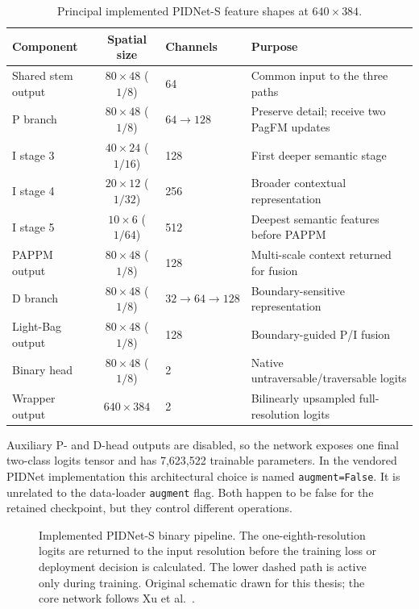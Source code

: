 \begin{table}[H]
\centering
\caption{Principal implemented PIDNet-S feature shapes at $640\times384$.}
\label{tab:pidnet_tensor_shapes}
\small
\begin{tabularx}{\textwidth}{@{}lclX@{}}
\toprule
\textbf{Component} & \textbf{Spatial size} & \textbf{Channels} & \textbf{Purpose} \\
\midrule
Shared stem output & $80\times48$ ($1/8$) & 64 & Common input to the three paths \\
P branch & $80\times48$ ($1/8$) & $64\rightarrow128$ & Preserve detail; receive two PagFM updates \\
I stage 3 & $40\times24$ ($1/16$) & 128 & First deeper semantic stage \\
I stage 4 & $20\times12$ ($1/32$) & 256 & Broader contextual representation \\
I stage 5 & $10\times6$ ($1/64$) & 512 & Deepest semantic features before PAPPM \\
PAPPM output & $80\times48$ ($1/8$) & 128 & Multi-scale context returned for fusion \\
D branch & $80\times48$ ($1/8$) & $32\rightarrow64\rightarrow128$ & Boundary-sensitive representation \\
Light-Bag output & $80\times48$ ($1/8$) & 128 & Boundary-guided P/I fusion \\
Binary head & $80\times48$ ($1/8$) & 2 & Native untraversable/traversable logits \\
Wrapper output & $640\times384$ & 2 & Bilinearly upsampled full-resolution logits \\
\bottomrule
\end{tabularx}
\end{table}

Auxiliary P- and D-head outputs are disabled, so the network exposes one final
two-class logits tensor and has 7,623,522 trainable parameters. In the vendored
PIDNet implementation this architectural choice is named
\texttt{augment=False}. It is unrelated to the data-loader
\texttt{augment} flag. Both happen to be false for the retained checkpoint, but
they control different operations.

\begin{figure}[H]
\centering
\resizebox{\textwidth}{!}{}
\caption[Implemented PIDNet-S binary pipeline.]{Implemented PIDNet-S binary
pipeline. The one-eighth-resolution logits are returned to the input
resolution before the training loss or deployment decision is calculated.
The lower dashed path is active only during training. Original schematic drawn
for this thesis; the core network follows Xu et al.~\cite{xu2023pidnet}.}
\label{fig:final_pidnet_binary_pipeline}
\end{figure}

